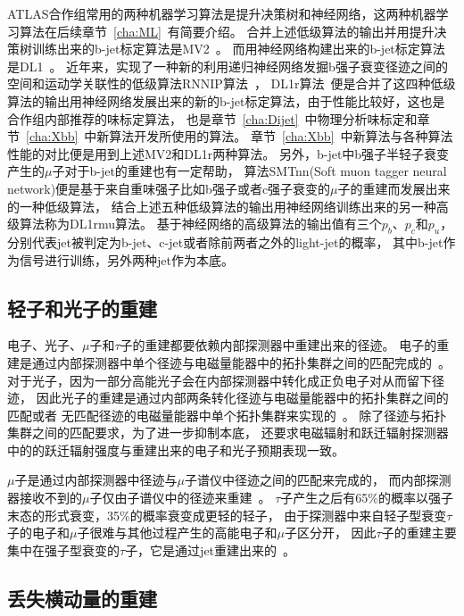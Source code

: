 ATLAS合作组常用的两种机器学习算法是提升决策树和神经网络，这两种机器学习算法在后续章节~\ref{cha:ML}~有简要介绍。
合并上述低级算法的输出并用提升决策树训练出来的b-jet标定算法是MV2~\cite{IPTD}。
而用神经网络构建出来的b-jet标定算法是DL1~\cite{IPTD}。
近年来，实现了一种新的利用递归神经网络发掘b强子衰变径迹之间的空间和运动学关联性的低级算法\textsc{RNNIP}算法~\cite{RNNIP}，
DL1r算法~\cite{DLOR1,DLOR2}便是合并了这四种低级算法的输出用神经网络发展出来的新的b-jet标定算法，由于性能比较好，这也是合作组内部推荐的味标定算法，
也是章节~\ref{cha:Dijet}~中物理分析味标定和章节~\ref{cha:Xbb}~中新算法开发所使用的算法。
章节~\ref{cha:Xbb}~中新算法与各种算法性能的对比便是用到上述MV2和DL1r两种算法。
另外，b-jet中b强子半轻子衰变产生的$\mu$子对于b-jet的重建也有一定帮助，
算法SMTnn(Soft muon tagger neural network)便是基于来自重味强子比如b强子或者c强子衰变的$\mu$子的重建而发展出来的一种低级算法，
结合上述五种低级算法的输出用神经网络训练出来的另一种高级算法称为DL1rmu算法。
基于神经网络的高级算法的输出值有三个$p_b$、$p_c$和$p_u$，分别代表jet被判定为b-jet、c-jet或者除前两者之外的light-jet的概率，
其中b-jet作为信号进行训练，另外两种jet作为本底。

\subsection{轻子和光子的重建}
\label{sec:LEPTON}

电子、光子、$\mu$子和$\tau$子的重建都要依赖内部探测器中重建出来的径迹。
电子的重建是通过内部探测器中单个径迹与电磁量能器中的拓扑集群之间的匹配完成的~\cite{LEPTON1,LEPTON2,LEPTON3}。
对于光子，因为一部分高能光子会在内部探测器中转化成正负电子对从而留下径迹，
因此光子的重建是通过内部两条转化径迹与电磁量能器中的拓扑集群之间的匹配或者
无匹配径迹的电磁量能器中单个拓扑集群来实现的~\cite{LEPTON2,LEPTON3}。
除了径迹与拓扑集群之间的匹配要求，为了进一步抑制本底，
还要求电磁辐射和跃迁辐射探测器中的的跃迁辐射强度与重建出来的电子和光子预期表现一致。

$\mu$子是通过内部探测器中径迹与$\mu$子谱仪中径迹之间的匹配来完成的，
而内部探测器接收不到的$\mu$子仅由子谱仪中的径迹来重建~\cite{LEPTON4,LEPTON5}。
$\tau$子产生之后有65\%的概率以强子末态的形式衰变，35\%的概率衰变成更轻的轻子，
由于探测器中来自轻子型衰变$\tau$子的电子和$\mu$子很难与其他过程产生的高能电子和$\mu$子区分开，
因此$\tau$子的重建主要集中在强子型衰变的$\tau$子，它是通过jet重建出来的~\cite{LEPTON6,LEPTON7,LEPTON8}。


\subsection{丢失横动量的重建}
\label{sec:MISSET}

